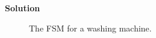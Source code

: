 \begin{enumerate}
        \begin{onlysolution}  \textbf{Solution} \itshape{
                \begin{figure}[ht]
                    \caption{The FSM for a washing machine.}
                \end{figure}

}
\end{onlysolution}
\end{enumerate}
